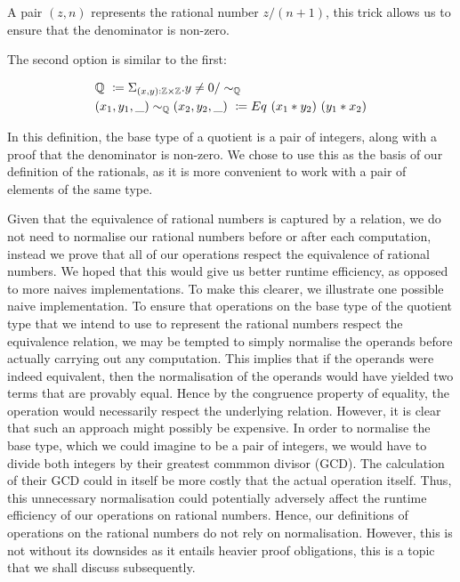 \documentclass[12pt,twoside,maitrise]{dms}
\theoremstyle{definition}
\numberwithin{equation}{section}
\numberwithin{table}{chapter}
\numberwithin{figure}{chapter}
\begin{document}
A pair $(z , n)$ represents the rational number $z / (n + 1)$, this trick allows us to ensure that the denominator is non-zero.

The second option is similar to the first:

\begin{align*}
  & \mathbb{Q} \ \coloneqq \Sigma_{\oftype{(x, y)}{\mathbb{Z} \times \mathbb{Z}}} . y \ne 0 / \sim_{\mathbb{Q}} \\
  & (x_1 , y_1, \_) \sim_{\mathbb{Q}} (x_2 , y_2, \_) \ \coloneqq Eq \ (x_1 * y_2) \ (y_1 * x_2)
\end{align*}

In this definition, the base type of a quotient is a pair of integers, along
with a proof that the denominator is non-zero. We chose to use this as the basis
of our definition of the rationals, as it is more convenient to work with a pair
of elements of the same type.

Given that the equivalence of rational numbers is captured by a relation, we do
not need to normalise our rational numbers before or after each computation,
instead we prove that all of our operations respect the equivalence of rational
numbers. We hoped that this would give us better runtime efficiency, as opposed
to more naives implementations. To make this clearer, we illustrate one possible
naive implementation. To ensure that operations on the base type of the quotient
type that we intend to use to represent the rational numbers respect the
equivalence relation, we may be tempted to simply normalise the operands before
actually carrying out any computation. This implies that if the operands were
indeed equivalent, then the normalisation of the operands would have yielded two
terms that are provably equal. Hence by the congruence property of equality, the
operation would necessarily respect the underlying relation. However, it is
clear that such an approach might possibly be expensive. In order to normalise
the base type, which we could imagine to be a pair of integers, we would have to
divide both integers by their greatest commmon divisor (GCD). The calculation of
their GCD could in itself be more costly that the actual operation itself. Thus,
this unnecessary normalisation could potentially adversely affect the runtime
efficiency of our operations on rational numbers. Hence, our definitions of
operations on the rational numbers do not rely on normalisation. However, this
is not without its downsides as it entails heavier proof obligations, this is a
topic that we shall discuss subsequently.
\end{document}
